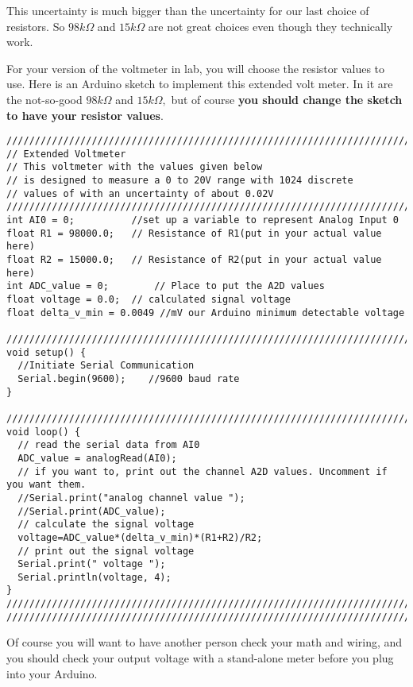 This uncertainty is much bigger than the uncertainty for our last choice of
resistors. So $98\unit{k%
\Omega%
}$ and $15\unit{k%
\Omega%
}$ are not great choices even though they technically work.

For your version of the voltmeter in lab, you will choose the resistor
values to use. Here is an Arduino sketch to implement this extended volt
meter. In it are the not-so-good $98\unit{k%
\Omega%
}$ and $15\unit{k%
\Omega%
},$ but of course \textbf{you should change the sketch to have your resistor
values}.
\begin{verbatim}
////////////////////////////////////////////////////////////////////////////
// Extended Voltmeter
// This voltmeter with the values given below
// is designed to measure a 0 to 20V range with 1024 discrete
// values of with an uncertainty of about 0.02V
////////////////////////////////////////////////////////////////////////////
int AI0 = 0;          //set up a variable to represent Analog Input 0
float R1 = 98000.0;   // Resistance of R1(put in your actual value here)
float R2 = 15000.0;   // Resistance of R2(put in your actual value here)
int ADC_value = 0;        // Place to put the A2D values
float voltage = 0.0;  // calculated signal voltage
float delta_v_min = 0.0049 //mV our Arduino minimum detectable voltage
 
////////////////////////////////////////////////////////////////////////////
void setup() {
  //Initiate Serial Communication
  Serial.begin(9600);    //9600 baud rate
}
 
////////////////////////////////////////////////////////////////////////////
void loop() {
  // read the serial data from AI0
  ADC_value = analogRead(AI0);
  // if you want to, print out the channel A2D values. Uncomment if you want them.
  //Serial.print("analog channel value ");
  //Serial.print(ADC_value);
  // calculate the signal voltage 
  voltage=ADC_value*(delta_v_min)*(R1+R2)/R2;
  // print out the signal voltage
  Serial.print(" voltage ");
  Serial.println(voltage, 4);  
}
////////////////////////////////////////////////////////////////////////////
////////////////////////////////////////////////////////////////////////////
\end{verbatim}

\bigskip Of course you will want to have another person check your math and
wiring, and you should check your output voltage with a stand-alone meter
before you plug into your Arduino.

